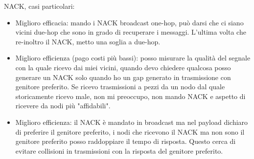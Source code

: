 \documentclass[12pt,italian]{report}
\begin{document}
NACK, casi particolari:
\begin{itemize}
    \item Miglioro efficacia: mando i NACK broadcast one-hop, può darsi che ci siano vicini due-hop che sono in grado di recuperare i messaggi. L'ultima volta che re-inoltro il NACK, metto una soglia a due-hop. 
    \item Miglioro efficienza (pago costi più bassi): posso misurare la qualità del segnale con la quale ricevo dai miei vicini, quando devo chiedere qualcosa posso generare un NACK solo quando ho un gap generato in trasmissione con genitore preferito. Se ricevo trasmissioni a pezzi da un nodo dal quale storicamente ricevo male, non mi preoccupo, non mando NACK e aspetto di ricevere da nodi più "affidabili". 
    \item Miglioro efficienza: il NACK è mandato in broadcast ma nel payload dichiaro di preferire il genitore preferito, i nodi che ricevono il NACK ma non sono il genitore preferito posso raddoppiare il tempo di risposta. Questo cerca di evitare collisioni in trasmissioni con la risposta del genitore preferito.
\end{itemize}
\end{document}
